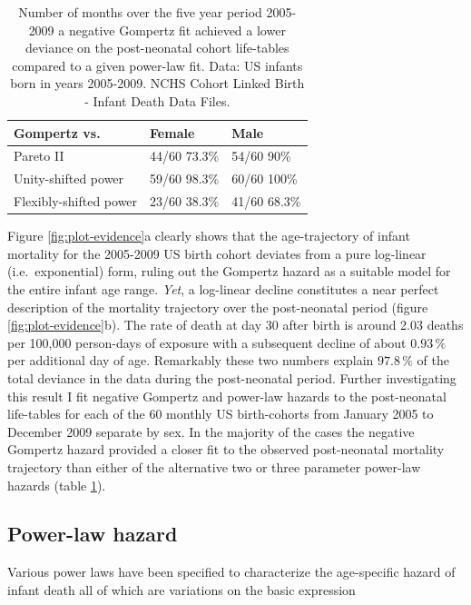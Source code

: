 \documentclass[smallextended]{svjour3} %
\begin{document}
\begin{table}[t]

\caption{\label{tab:tab-postneonatal}Number of months over the five year period 2005-2009 a negative Gompertz fit achieved a lower deviance on the post-neonatal cohort life-tables compared to a given power-law fit. Data: US infants born in years 2005-2009. NCHS Cohort Linked Birth - Infant Death Data Files.}
\centering
\begin{tabular}{lll}
\toprule
Gompertz vs. & Female & Male\\
\midrule
Pareto II & 44/60 73.3\% & 54/60   90\%\\
Unity-shifted power & 59/60 98.3\% & 60/60  100\%\\
Flexibly-shifted power & 23/60 38.3\% & 41/60 68.3\%\\
\bottomrule
\end{tabular}
\end{table}

Figure \ref{fig:plot-evidence}a clearly shows that the age-trajectory of
infant mortality for the 2005-2009 US birth cohort deviates from a pure
log-linear (i.e.~exponential) form, ruling out the Gompertz hazard as a
suitable model for the entire infant age range. \emph{Yet}, a log-linear
decline constitutes a near perfect description of the mortality
trajectory over the post-neonatal period (figure
\ref{fig:plot-evidence}b). The rate of death at day 30 after birth is
around 2.03 deaths per 100,000 person-days of exposure with a subsequent
decline of about \(0.93\,\%\) per additional day of age. Remarkably
these two numbers explain \(97.8\,\%\) of the total deviance in the data
during the post-neonatal period. Further investigating this result I fit
negative Gompertz and power-law hazards to the post-neonatal life-tables
for each of the 60 monthly US birth-cohorts from January 2005 to
December 2009 separate by sex. In the majority of the cases the negative
Gompertz hazard provided a closer fit to the observed post-neonatal
mortality trajectory than either of the alternative two or three
parameter power-law hazards (table \ref{tab:tab-postneonatal}).

\subsection*{Power-law hazard}\label{power-law-hazard}

Various power laws have been specified to characterize the age-specific
hazard of infant death
\citep{Oppermann1870, Brillinger1961, Choe1981, DeBeer2016, Berrut2016}
all of which are variations on the basic expression
\end{document}
